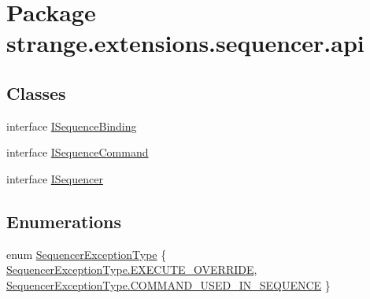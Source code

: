 \hypertarget{namespacestrange_1_1extensions_1_1sequencer_1_1api}{\section{Package strange.\-extensions.\-sequencer.\-api}
\label{namespacestrange_1_1extensions_1_1sequencer_1_1api}
}
\subsection*{Classes}
\begin{DoxyCompactItemize}
\item 
interface \hyperlink{interfacestrange_1_1extensions_1_1sequencer_1_1api_1_1_i_sequence_binding}{I\-Sequence\-Binding}
\item 
interface \hyperlink{interfacestrange_1_1extensions_1_1sequencer_1_1api_1_1_i_sequence_command}{I\-Sequence\-Command}
\item 
interface \hyperlink{interfacestrange_1_1extensions_1_1sequencer_1_1api_1_1_i_sequencer}{I\-Sequencer}
\end{DoxyCompactItemize}
\subsection*{Enumerations}
\begin{DoxyCompactItemize}
\item 
enum \hyperlink{namespacestrange_1_1extensions_1_1sequencer_1_1api_aeddaacdea22f90d94ab298d24cbce41b}{Sequencer\-Exception\-Type} \{ \hyperlink{namespacestrange_1_1extensions_1_1sequencer_1_1api_aeddaacdea22f90d94ab298d24cbce41ba649c27d7db043238f4e8ee0d1c8c52fc}{Sequencer\-Exception\-Type.\-E\-X\-E\-C\-U\-T\-E\-\_\-\-O\-V\-E\-R\-R\-I\-D\-E}, 
\hyperlink{namespacestrange_1_1extensions_1_1sequencer_1_1api_aeddaacdea22f90d94ab298d24cbce41ba80650e930022474abe93d5663d7e6744}{Sequencer\-Exception\-Type.\-C\-O\-M\-M\-A\-N\-D\-\_\-\-U\-S\-E\-D\-\_\-\-I\-N\-\_\-\-S\-E\-Q\-U\-E\-N\-C\-E}
 \}
\end{DoxyCompactItemize}


